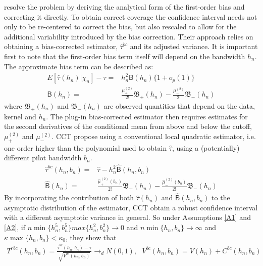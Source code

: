\documentclass[12pt,fleqn]{article}
\begin{document}
\cite{calonico2014} resolve the problem by deriving the analytical form of the first-order bias and correcting it directly. To obtain correct coverage the confidence interval needs not only to be re-centered to correct the bias, but also rescaled to allow for the additional variability introduced by the bias correction. Their approach relies on obtaining a bias-corrected  estimator, $\hat{\tau}^{bc}$ and its adjusted variance. It is important first to note that the first-order bias term itself will depend on the bandwidth $h_{n}$. The approximate bias term can be described as:
\begin{align*}
     E[\hat{\tau}(h_{n})|\chi_{n}]-\tau=& h_{n}^{2}\mathsf{B}(h_{n})\{1+o_{p}(1)\}\\
     \mathsf{B}(h_{n})=&\frac{\mu_{+}^{(2)}}{2!}\mathfrak{B}_{+}(h_{n})-\frac{\mu_{-}^{(2)}}{2!}\mathfrak{B}_{-}(h_{n})
   \end{align*}
where $\mathfrak{B}_{+}(h_{n})$ and $\mathfrak{B}_{-}(h_{n})$ are observed quantities that depend on the data, kernel and $h_{n}$. The plug-in bias-corrected estimator then requires estimates for the second derivatives of the conditional mean from above and below the cutoff, $\mu_{+}^{(2)}$ and $\mu_{-}^{(2)}$. CCT propose using a conventional local quadratic estimator, i.e. one order higher than the polynomial used to obtain $\hat{\tau}$,  using a (potentially) different pilot bandwidth $b_{n}$.
\begin{align*}
     \hat{\tau}^{bc}(h_{n}, b_{n})=& \hat{\tau}-h_{n}^{2}\hat{\mathsf{B}}(h_{n},b_{n})\\
     \hat{\mathsf{B}}(h_{n})=&\frac{\hat{\mu}_{+}^{(2)}(b_{n})}{2!}\mathfrak{B}_{+}(h_{n})-\frac{\hat{\mu}_{-}^{(2)}(b_{n})}{2!}\mathfrak{B}_{-}(h_{n})
   \end{align*}
By incorporating the contribution of both $\hat{\tau}(h_{n})$ and $\hat{\mathsf{B}}(h_{n},b_{n})$ to the asymptotic distribution of the estimator, CCT obtain a robust confidence interval with a different asymptotic variance in general. So under Assumptions \ref{A1} and \ref{A2}, if $n\min\{h_{n}^{5}, b_{n}^{5}\}max\{h_{n}^{2}, b_{n}^{2}\}\rightarrow 0$ and $n\min\{h_{n}, b_{n}\}\rightarrow \infty$ and $\kappa \max\{h_{n},b_{n}\}< \kappa_{0}$, they show that
\begin{align}
  T^{rbc}(h_{n}, b_{n})=\frac{\hat{\tau}^{bc}(h_{n}, b_{n})-\tau}{\sqrt{V^{bc}(h_{n}, b_{n})}}\rightarrow_{d}N(0,1), \text{        }V^{bc}(h_{n}, b_{n})=V(h_{n})+C^{bc}(h_{n}, b_{n})\\
 \end{align}
\end{document}
